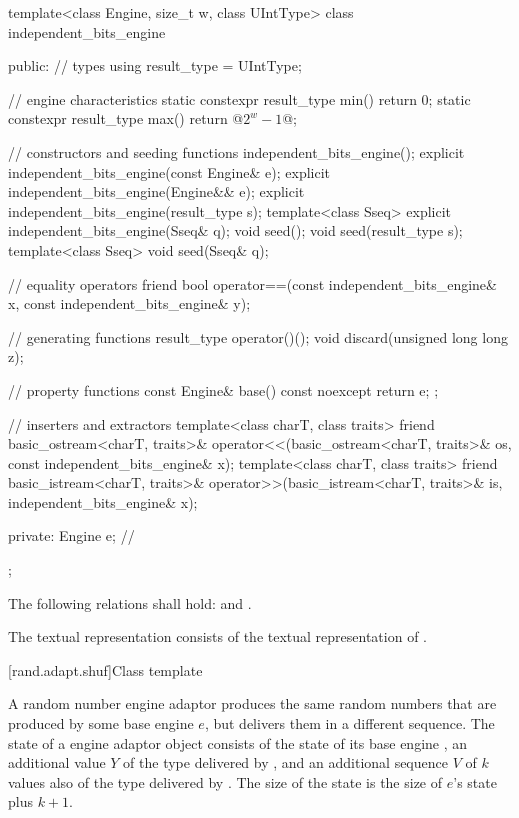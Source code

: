 %
%
\begin{codeblock}
template<class Engine, size_t w, class UIntType>
  class independent_bits_engine {
  public:
    // types
    using result_type = UIntType;

    // engine characteristics
    static constexpr result_type min() { return 0; }
    static constexpr result_type max() { return @$2^w - 1$@; }

    // constructors and seeding functions
    independent_bits_engine();
    explicit independent_bits_engine(const Engine& e);
    explicit independent_bits_engine(Engine&& e);
    explicit independent_bits_engine(result_type s);
    template<class Sseq> explicit independent_bits_engine(Sseq& q);
    void seed();
    void seed(result_type s);
    template<class Sseq> void seed(Sseq& q);

    // equality operators
    friend bool operator==(const independent_bits_engine& x, const independent_bits_engine& y);

    // generating functions
    result_type operator()();
    void discard(unsigned long long z);

    // property functions
    const Engine& base() const noexcept { return e; };

    // inserters and extractors
    template<class charT, class traits>
      friend basic_ostream<charT, traits>&
        operator<<(basic_ostream<charT, traits>& os, const independent_bits_engine& x);
    template<class charT, class traits>
      friend basic_istream<charT, traits>&
        operator>>(basic_istream<charT, traits>& is, independent_bits_engine& x);

  private:
    Engine e;   // \expos
  };
\end{codeblock}%

\pnum
The following relations shall hold:
and
  .

\pnum
The textual representation
consists of the textual representation of .



[rand.adapt.shuf]{Class template }%
%

\pnum
A  random number engine adaptor
produces the same random numbers
that are produced by some base engine $e$,
but delivers them in a different sequence.
The state 
of a  engine adaptor object 
consists of
 the state  of its base engine ,
 an additional value $Y$ of the type delivered by ,
and
 an additional sequence $V$ of $k$ values
 also of the type delivered by .
The size of the state is
 the size of $e$'s state plus $k + 1$.

